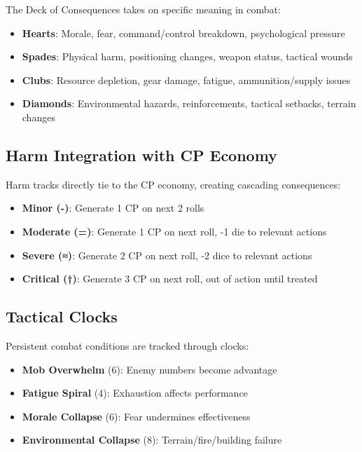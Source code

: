 The Deck of Consequences takes on specific meaning in combat:

\begin{itemize}
    \item \textbf{Hearts}: Morale, fear, command/control breakdown, psychological pressure
    \item \textbf{Spades}: Physical harm, positioning changes, weapon status, tactical wounds
    \item \textbf{Clubs}: Resource depletion, gear damage, fatigue, ammunition/supply issues
    \item \textbf{Diamonds}: Environmental hazards, reinforcements, tactical setbacks, terrain changes
\end{itemize}

\subsection{Harm Integration with CP Economy}

Harm tracks directly tie to the CP economy, creating cascading consequences:

\begin{itemize}
    \item \textbf{Minor (-)}: Generate 1 CP on next 2 rolls
    \item \textbf{Moderate (=)}: Generate 1 CP on next roll, -1 die to relevant actions
    \item \textbf{Severe (≈)}: Generate 2 CP on next roll, -2 dice to relevant actions  
    \item \textbf{Critical (†)}: Generate 3 CP on next roll, out of action until treated
\end{itemize}

\subsection{Tactical Clocks}

Persistent combat conditions are tracked through clocks:

\begin{itemize}
    \item \textbf{Mob Overwhelm} (6): Enemy numbers become advantage
    \item \textbf{Fatigue Spiral} (4): Exhaustion affects performance
    \item \textbf{Morale Collapse} (6): Fear undermines effectiveness
    \item \textbf{Environmental Collapse} (8): Terrain/fire/building failure
\end{itemize}

